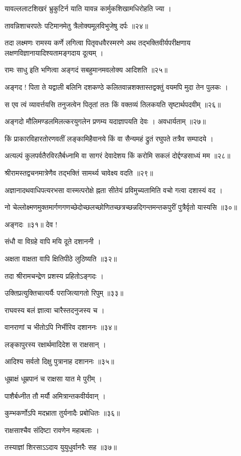 यावल्ललाटशिखरं भ्रुकुटिर्न याति यावन्न कार्मुकशिखामधिरोहति ज्या ।

तावन्निशाचरपतेः पटिमानमेतु त्रैलोक्यमूलविभुजेषु दर्पः ॥२४॥

तदा लक्ष्मणः रामस्य कर्णे लगित्वा पितृवधवैरस्मरणे अथ तद्भक्तिवीर्यपरीक्षणाय लक्षणविज्ञानायादिश्यतामङ्गदाय दूत्यम् ।

रामः साधु इति भणित्वा अङ्गदं सबहुमानमवलोक्य आदिशति ॥२५॥

अङ्गद ! पिता ते यद्वाली बलिनि दशकण्ठे कलितवान्नशक्तास्तद्वक्तुं वयमपि मुदा तेन पुलकः ।

स एव त्वं व्यावर्त्तयसि तनुजत्वेन पितृतां ततः किं वक्तव्यं तिलकयति सृष्टार्थपदवीम् ॥२६॥

अङ्गदो मौलिमण्डलमिलत्करयुगलेन प्रणम्य यदाज्ञापयति देवः । अवधार्यताम् ॥२७॥

किं प्राकारविहारतोरणवतीं लङ्कामिहैवानये किं वा सैन्यमहं द्रुतं रघुपते तत्रैव सम्पादये ।

अत्यल्पं कुलपर्वतैरविरलैर्बध्नामि वा सागरं देवादेशय किं करोमि सकलं दोर्द्दण्डसाध्यं मम ॥२८॥

श्रीरामस्तद्वचनमात्रेणैव तद्भक्तिं सामर्थ्य चावेक्ष्य वदति ॥२९॥

अज्ञानादथवाधिपत्यरभसा वास्मत्परोक्षे ह्नता सीतेयं प्रविमुच्यतामिति वचो गत्वा दशास्यं वद ।

नो चेल्लोक्ष्मणमुक्तमार्गणगणच्छेदोच्छलच्छोणितच्छत्रच्छन्नदिगन्तमन्तकपुरीं पुत्रैर्वृतो यास्यसि ॥३०॥

अङ्गदः ॥३१॥ देव !

संधौ वा विग्रहे वापि मयि दूते दशाननी ।

अक्षता वाक्षता वापि क्षितिपीठे लुठिष्यति ॥३२॥

तदा श्रीरामचन्द्रेण प्रशस्य प्रहितोऽङ्गदः ।

उक्तिप्रत्युक्तिचात्यर्यैः पराजित्यागतो रिपुम् ॥३३॥

राघवस्य बलं ज्ञात्वा चारैस्तदनुजस्य च ।

वानराणां च भीतोऽपि निर्भीरिव दशाननः ॥३४॥

लङ्कापुरस्य रक्षार्थमादिदेश स राक्षसान् ।

आदिश्य सर्वतो दिक्षु पुत्रानाह दशाननः ॥३५॥

धूम्राक्षं धूम्रपानं च राक्षसा यात मे पुरीम् ।

पाशैर्बध्नीत तौ मर्यौ अमित्रान्तकवीर्यवान् ।

कुम्भकर्णोऽपि मदभ्राता तुर्यनादैः प्रबोधितः ॥३६॥

राक्षसाश्चैव संदिष्टा रावणेन महाबलाः ।

तस्याज्ञां शिरसाऽऽदाय युयुधुर्वानरैः सह ॥३७॥

